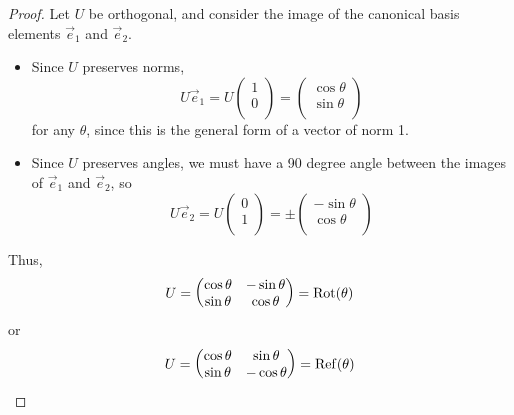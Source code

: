 \documentclass{../../template/note}
\begin{document}
    \begin{proof}
        Let \(U\) be orthogonal, and consider the image of the canonical basis elements \(\vec e_1\) and \(\vec e_2\).
        \begin{itemize}
            \item Since \(U\) preserves norms,
            \[
                U \vec e_1 = 
                U \begin{pmatrix}
                 1 \\
                 0 \\
                \end{pmatrix} = \begin{pmatrix}
                 \cos \theta \\
                 \sin \theta \\
                \end{pmatrix}
            \]
            for any \(\theta\), since this is the general form of a vector of norm 1.
            \item Since \(U\) preserves angles, we must have a 90 degree angle between the images of \(\vec e_1\) and \(\vec e_2\), so
            \[
                U \vec e_2 =
                U \begin{pmatrix}
                 0 \\
                 1 \\
                \end{pmatrix} = \pm \begin{pmatrix}
                 -\sin \theta \\
                 \cos \theta \\
                \end{pmatrix}
            \]
        \end{itemize}
        Thus,
        \begin{align*}
            U = \begin{pmatrix}
                \cos \theta & -\sin \theta \\
                \sin \theta & \cos \theta \\
            \end{pmatrix}
            = \operatorname{Rot}(\theta)
        \end{align*}
        or
        \begin{align*}
            U = \begin{pmatrix}
                \cos \theta & \sin \theta \\
                \sin \theta & -\cos \theta \\
            \end{pmatrix}
            = \operatorname{Ref}(\theta)
        \end{align*}
    \end{proof}
    
\end{document}
